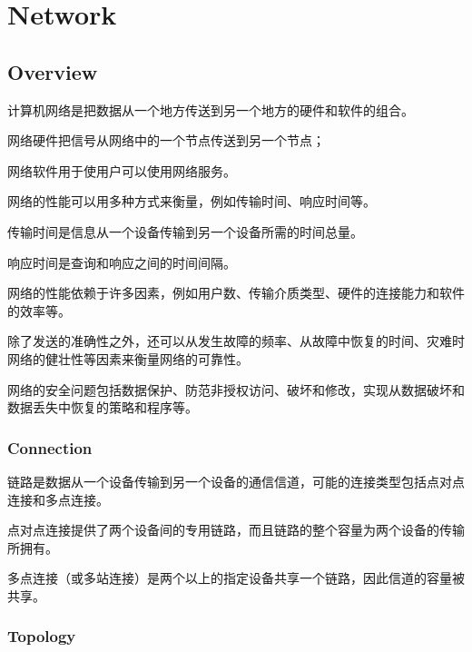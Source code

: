 \part{Network}

\chapter{Overview}


计算机网络是把数据从一个地方传送到另一个地方的硬件和软件的组合。


\begin{compactitem}
\item 网络硬件把信号从网络中的一个节点传送到另一个节点；
\item 网络软件用于使用户可以使用网络服务。
\end{compactitem}

网络的性能可以用多种方式来衡量，例如传输时间、响应时间等。

\begin{compactitem}
\item 传输时间是信息从一个设备传输到另一个设备所需的时间总量。
\item 响应时间是查询和响应之间的时间间隔。
\end{compactitem}

网络的性能依赖于许多因素，例如用户数、传输介质类型、硬件的连接能力和软件的效率等。

除了发送的准确性之外，还可以从发生故障的频率、从故障中恢复的时间、灾难时网络的健壮性等因素来衡量网络的可靠性。

网络的安全问题包括数据保护、防范非授权访问、破坏和修改，实现从数据破坏和数据丢失中恢复的策略和程序等。

\section{Connection}

链路是数据从一个设备传输到另一个设备的通信信道，可能的连接类型包括点对点连接和多点连接。

\begin{compactitem}
\item 点对点连接提供了两个设备间的专用链路，而且链路的整个容量为两个设备的传输所拥有。
\item 多点连接（或多站连接）是两个以上的指定设备共享一个链路，因此信道的容量被共享。
\end{compactitem}

\section{Topology}

